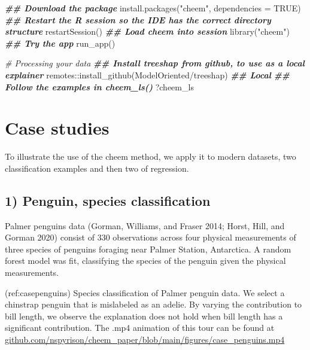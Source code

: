 \documentclass[
]{article}
\newenvironment{Shaded}{\begin{snugshade}}{\end{snugshade}}
\newcommand{\AttributeTok}[1]{\textcolor[rgb]{0.77,0.63,0.00}{#1}}
\newcommand{\CommentTok}[1]{\textcolor[rgb]{0.56,0.35,0.01}{\textit{#1}}}
\newcommand{\ConstantTok}[1]{\textcolor[rgb]{0.00,0.00,0.00}{#1}}
\newcommand{\DocumentationTok}[1]{\textcolor[rgb]{0.56,0.35,0.01}{\textbf{\textit{#1}}}}
\newcommand{\FunctionTok}[1]{\textcolor[rgb]{0.00,0.00,0.00}{#1}}
\newcommand{\NormalTok}[1]{#1}
\newcommand{\SpecialCharTok}[1]{\textcolor[rgb]{0.00,0.00,0.00}{#1}}
\newcommand{\StringTok}[1]{\textcolor[rgb]{0.31,0.60,0.02}{#1}}
\begin{document}
\begin{Shaded}
\begin{Highlighting}[]
\DocumentationTok{\#\# Download the package}
\FunctionTok{install.packages}\NormalTok{(}\StringTok{"cheem"}\NormalTok{, }\AttributeTok{dependencies =} \ConstantTok{TRUE}\NormalTok{)}
\DocumentationTok{\#\# Restart the R session so the IDE has the correct directory structure}
\FunctionTok{restartSession}\NormalTok{()}
\DocumentationTok{\#\# Load cheem into session}
\FunctionTok{library}\NormalTok{(}\StringTok{"cheem"}\NormalTok{)}
\DocumentationTok{\#\# Try the app}
\FunctionTok{run\_app}\NormalTok{()}

\CommentTok{\# Processing your data}
\DocumentationTok{\#\# Install treeshap from github, to use as a local explainer}
\NormalTok{remotes}\SpecialCharTok{::}\FunctionTok{install\_github}\NormalTok{(}\StringTok{\textquotesingle{}ModelOriented/treeshap\textquotesingle{}}\NormalTok{) }\DocumentationTok{\#\# Local }
\DocumentationTok{\#\# Follow the examples in cheem\_ls()}
\NormalTok{?cheem\_ls}
\end{Highlighting}
\end{Shaded}

\hypertarget{sec:casestudies}{%
\section{Case studies}\label{sec:casestudies}}

To illustrate the use of the cheem method, we apply it to modern
datasets, two classification examples and then two of regression.

\hypertarget{penguin-species-classification}{%
\subsection{1) Penguin, species
classification}\label{penguin-species-classification}}

Palmer penguins data (Gorman, Williams, and Fraser 2014; Horst, Hill,
and Gorman 2020) consist of 330 observations across four physical
measurements of three species of penguins foraging near Palmer Station,
Antarctica. A random forest model was fit, classifying the species of
the penguin given the physical measurements.

(ref:casepenguins) Species classification of Palmer penguin data. We
select a chinstrap penguin that is mislabeled as an adelie. By varying
the contribution to bill length, we observe the explanation does not
hold when bill length has a significant contribution. The .mp4 animation
of this tour can be found at
\href{https://github.com/nspyrison/cheem_paper/blob/main/figures/case_penguins.mp4}{github.com/nspyrison/cheem\_paper/blob/main/figures/case\_penguins.mp4}
\end{document}
